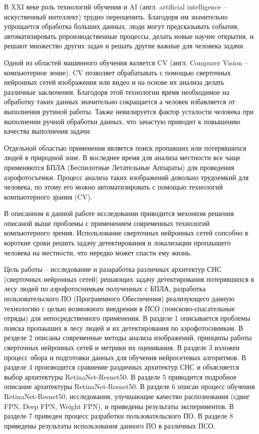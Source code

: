 
В XXI веке роль технологий обучения и AI (англ. artificial intelligence -- искуственный интеллект) трудно переоценить. Благодоря им значительно упрощается обработка больших данных, люди могут предсказывать события, автоматизировать рпроизводственные процессы, делать новые научне открытия, и решают множество других задач и решать другие важные для человека задачи.

Одной из областей машинного обучения яаляется CV (англ. Compurer Vision -- компьютерное зение). CV позволяет обрабатывать с помощью сверточных нейронных сетей изображения или видео и на основе их анализа делать различные заключения. Благодоря этой технологии время необходимое на обработку таких данных значительно сокращается а человек избавляется от выполнения рутиной работы. Также невилируется фактор усталости человека при выполнении ручной обработки данных, что зачастую приводит к повышению качества выполнения задачи.

Отдельной областью применения является поиск пропавших или потерявшихся людей в природной зоне. В воследнее время для анализа местности все чаще применяются БПЛА (Беспилотные Летательные Аппараты) для проведения аэрофотосъемки. Процесс анализа таких изображений довольно трудоемкий для человека, по этому его можно автоматизировать с помощью технологий компьютерного зрания (CV). 

В описанном в данной работе исследовании приводится мехонизм решения описаной выше проблемы с применением современных технологий компьютерного зрения. Использование сверточных нейронных сетей сопсобно в короткие сроки решить задачу детектирования и локализации пропаышего человека на местности, что нередко может спасти ему жизнь. 

Цель работы -- исследование и разаработка различных архитектур СНС (сверточных нейронных сетей) решающих задачу детектирования потерявшихся в лесу людей по аэрофотоснимкам полученных с БПЛА, разработка пользовательского ПО (Программного Обеспечения) реализующего данную технологию с целью возможного внедрения в ПСО (поисково-спасательные отряды) для непосредственного применения. В разделе 1 описывается проблемы поиска пропаыших в лесу людей и их детектирования по аэрофотоснимкам. В резделе 2 описаны современные методы анализа изображений, принципы работы сверточных нейронных сетей и метрики их оценивания. В разделе 3 изложен процесс обора и подготовки данных для обучения нейросетевых алгоритмов. В разделе 4 производится сравнение раздичных архитектур СНС и объясняется выбор архитектуры RetinaNet-Resnet50. В разделе 5 приводится подробное описание архитектуры RetinaNet-Resnet50. В разделе 6 описан процесс обучения RetinaNet-Resnet50, исследования, улучшающие качество распознования (сдвиг FPN, Deep FPN, Weight FPN), и приведены результаты экспериментов. В разделе 7 приведен процесс разработки пользовательского ПО. В разделе 8 приведены результаты использования данного ПО в различных ПСО.
\clearpage